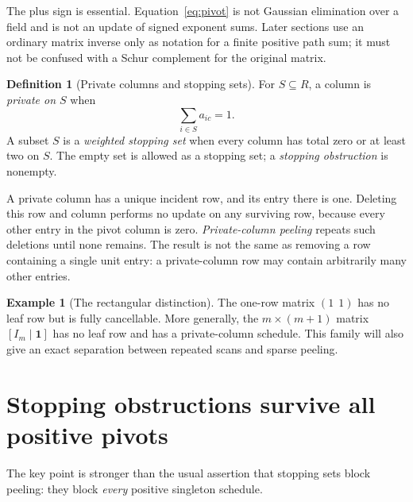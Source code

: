 \documentclass[11pt]{article}
\theoremstyle{definition}\newtheorem{definition}[theorem]{Definition}
\newtheorem{example}[theorem]{Example}
\theoremstyle{remark}\newtheorem{remark}[theorem]{Remark}
\begin{document}
The plus sign is essential. Equation~\eqref{eq:pivot} is not Gaussian elimination over a field and is not an update of signed exponent sums. Later sections use an ordinary matrix inverse only as notation for a finite positive path sum; it must not be confused with a Schur complement for the original matrix.

\begin{definition}[Private columns and stopping sets]
For $S\subseteq R$, a column is \emph{private on $S$} when
\[
 \sum_{i\in S}a_{ic}=1.
\]
A subset $S$ is a \emph{weighted stopping set} when every column has total zero or at least two on $S$. The empty set is allowed as a stopping set; a \emph{stopping obstruction} is nonempty.
\end{definition}

A private column has a unique incident row, and its entry there is one. Deleting this row and column performs no update on any surviving row, because every other entry in the pivot column is zero. \emph{Private-column peeling} repeats such deletions until none remains. The result is not the same as removing a row containing a single unit entry: a private-column row may contain arbitrarily many other entries.

\begin{example}[The rectangular distinction]
The one-row matrix $(1\ \ 1)$ has no leaf row but is fully cancellable. More generally, the $m\times(m+1)$ matrix $[I_m\mid\mathbf 1]$ has no leaf row and has a private-column schedule. This family will also give an exact separation between repeated scans and sparse peeling.
\end{example}

\section{Stopping obstructions survive all positive pivots}
\label{sec:invariant}
The key point is stronger than the usual assertion that stopping sets block peeling: they block \emph{every} positive singleton schedule.
\end{document}
